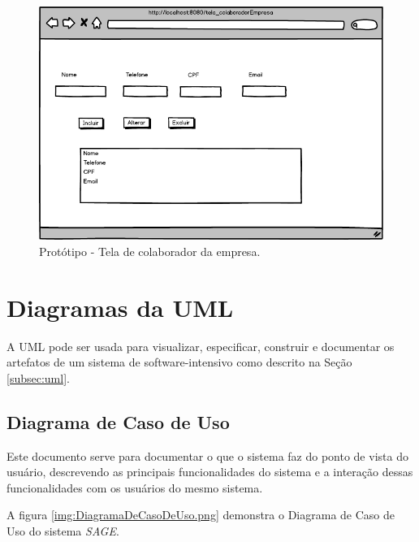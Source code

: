 \begin{figure}[!htb]
 \centering \includegraphics[scale=0.5]{imagens/prototipo_colaboradorEmpresa.png}
 \caption{Protótipo - Tela de colaborador da empresa.}
 \label{img:prototipo_colaboradorEmpresa.png}
\end{figure}

\section{Diagramas da UML}
\label{sec:diagramas}

A UML pode ser usada para visualizar, especificar, construir e documentar os
artefatos de um sistema de software-intensivo como descrito na Seção
\ref{subsec:uml}.

\subsection{Diagrama de Caso de Uso}
\label{sec:diagramaCasoUso}

Este documento serve para documentar o que o sistema faz do ponto de vista do
usuário, descrevendo as principais funcionalidades do sistema e a interação
dessas funcionalidades com os usuários do mesmo sistema.

A figura \ref{img:DiagramaDeCasoDeUso.png} demonstra
o Diagrama de Caso de Uso do sistema {\it SAGE}.

